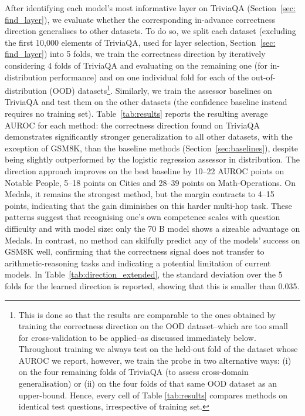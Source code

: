 \documentclass{article} %
\begin{document}
After identifying each model’s most informative layer on TriviaQA (Section~\ref{sec: find_layer}), we evaluate whether the corresponding in-advance correctness direction generalises to other datasets. To do so, we split each dataset (excluding the first 10,000 elements of TriviaQA, used for layer selection, Section~\ref{sec: find_layer}) into 5 folds, we train the correctness direction by iteratively considering 4 folds of TriviaQA and evaluating on the remaining one (for in-distribution performance) and on one individual fold for each of the out-of-distribution (OOD) datasets\footnote{This is done so that the results are comparable to the ones obtained by training the correctness direction on the OOD dataset--which are too small for cross-validation to be applied--as discussed immediately below. Throughout training we always test on the held-out fold of the dataset whose AUROC we report, however, we train the probe in two alternative ways: (i) on the four remaining folds of TriviaQA (to assess cross-domain generalisation) or (ii) on the four folds of that same OOD dataset as an upper-bound. Hence, every cell of Table \ref{tab:results} compares methods on identical test questions, irrespective of training set.}. 
Similarly, we train the assessor baselines on TriviaQA and test them on the other datasets (the confidence baseline instead requires no training set).
Table~\ref{tab:results} reports the resulting average AUROC for each method: the correctness direction found on TriviaQA demonstrates significantly stronger  generalization to all other datasets, with the exception of GSM8K, than the baseline methods (Section~\ref{sec:baselines}), despite being slightly outperformed by the logistic regression assessor in distribution. The direction approach improves on the best baseline by 10–22 AUROC points on Notable People, 5–18 points on Cities and 28–39 points on Math-Operations. On Medals, it remains the strongest method, but the margin contracts to 4–15 points, indicating that the gain diminishes on this harder multi-hop task.  These patterns suggest that recognising one’s own competence scales with question difficulty and with model size: only the 70 B model shows a sizeable advantage on Medals.  In contrast, no method can skilfully predict any of the models' success on GSM8K well, confirming that the correctness signal does not transfer to arithmetic-reasoning tasks and indicating a potential limitation of current models. In Table~\ref{tab:direction_extended}, the standard deviation over the 5 folds for the learned direction is reported, showing that this is smaller than 0.035.
\end{document}
